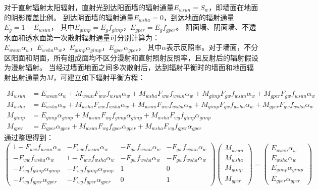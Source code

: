 对于直射辐射太阳辐射，直射光到达阳面墙的辐射通量$E_{wsun}=S_w$，即墙面在地面的阴影覆盖比例。
到达阴面墙的辐射通量$E_{wsha}=0$，到达地面的辐射通量$E_g=1-E_{wsun}$，
其中$E_{gimp}=E_gf_{gimp}$，$E_{gper}=E_gf_{gper}$。
阳面墙、阴面墙、不透水面和透水面第一次散射辐射通量可分别计算为：
$E_{wsun}\alpha_w，E_{wsha}\alpha_w，E_{gimp}\alpha_{gimp}，E_{gper}\alpha_{gper}$，
其中$\alpha$表示反照率。对于墙面，不分区阳面和阴面，所有组成面均不区分漫射和直射照射反照率，且反射后的辐射假设为漫射辐射。
当经过墙面地面之间多次散射后，达到辐射平衡时的墙面和地面辐射出射通量为$M$，可建立如下辐射平衡方程：
\begin{landscape}
\begin{equation}
\begin{aligned}
    M_{ {wsun }} &=E_{wsun} \alpha_{w}+M_{wsun} F_{ww} f_{wsun} \alpha_{w}+M_{wsha} F_{ww} f_{wsun} \alpha_{w}+M_{gimp} F_{g w} f_{wsun} \alpha_{w}+M_{gper} F_{g w} f_{wsun} \alpha_{w} \\ 
    M_{wsha} &=E_{wsha} \alpha_{w}+M_{wsha} F_{ww} f_{wsha} \alpha_{w}+M_{wsun} F_{ww} f_{wsha} \alpha_{w}+M_{gimp} F_{g w} f_{wsha} \alpha_{w}+M_{gper} F_{g w} f_{wsha} \alpha_{w} \\ 
    M_{gimp} &=E_{gimp} \alpha_{gimp}+M_{wsun} F_{w g} f_{ gimp} \alpha_{gimp}+M_{wsha} F_{w g} f_{ gimp} \alpha_{gimp} \\ 
    M_{gper} &=E_{gper} \alpha_{gper}+M_{wsun} F_{w g} f_{gper} \alpha_{gper}+M_{wsha} F_{w g} f_{gper} \alpha_{gper}
\end{aligned}
\end{equation}
通过整理得到：
\begin{equation}\label{城市无植被辐射传输方程}
\left(\begin{array}{cccc}1-F_{ww} f_{wsun} \alpha_{w} & -F_{ww} f_{wsun} \alpha_{w} & -F_{g w} f_{wsun} \alpha_{w} & -F_{g w} f_{wsun} \alpha_{w} \\
    -F_{ww} f_{wsha} \alpha_{w} & 1-F_{ww} f_{wsha} \alpha_{w} & -F_{g w} f_{wsha} \alpha_{w} & -F_{g w} f_{wsha} \alpha_{w} \\
    -F_{w g} f_{gimp} \alpha_{gimp} & -F_{w g} f_{gimp} \alpha_{gimp} & 1 & 0 \\ 
    -F_{w g} f_{gper} \alpha_{gper} & -F_{w g} f_{gper} \alpha_{gper} & 0 & 1\end{array}\right)
    \left(\begin{array}{l}M_{wsun} \\ M_{ {wsha }} \\ 
    M_{ gimp} \\ 
    M_{gper}\end{array}\right)=\left(\begin{array}{c}E_{wsun} \alpha_{w} \\
    E_{wsha} \alpha_{w} \\
    E_{gimp} \alpha_{ gimp} \\
    E_{gper} \alpha_{gper}\end{array}\right)
\end{equation}
\end{landscape}

